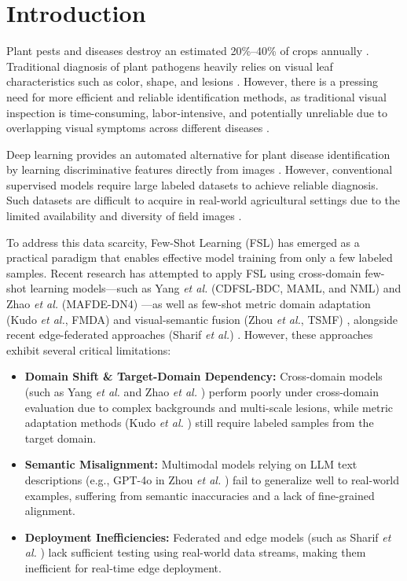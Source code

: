 \documentclass[conference]{IEEEtran}
\begin{document}
\section{Introduction}
Plant pests and diseases destroy an estimated 20\%--40\% of crops annually \cite{richard2022control}. Traditional diagnosis of plant pathogens heavily relies on visual leaf characteristics such as color, shape, and lesions \cite{khakimov2022traditional}. However, there is a pressing need for more efficient and reliable identification methods, as traditional visual inspection is time-consuming, labor-intensive, and potentially unreliable due to overlapping visual symptoms across different diseases \cite{shoaib2023advanced}.

Deep learning provides an automated alternative for plant disease identification by learning discriminative features directly from images \cite{shoaib2023advanced}. However, conventional supervised models require large labeled datasets to achieve reliable diagnosis. Such datasets are difficult to acquire in real-world agricultural settings due to the limited availability and diversity of field images \cite{shoaib2023advanced, shafik2023systematic}.

To address this data scarcity, Few-Shot Learning (FSL) has emerged as a practical paradigm that enables effective model training from only a few labeled samples. Recent research has attempted to apply FSL using cross-domain few-shot learning models---such as Yang \textit{et al.} (CDFSL-BDC, MAML, and NML) \cite{yang2024laboratory} and Zhao \textit{et al.} (MAFDE-DN4) \cite{zhao2024mafde}---as well as few-shot metric domain adaptation (Kudo \textit{et al.}, FMDA) \cite{kudo2025few} and visual-semantic fusion (Zhou \textit{et al.}, TSMF) \cite{zhou2026vsf}, alongside recent edge-federated approaches (Sharif \textit{et al.}) \cite{sharif2026real}. However, these approaches exhibit several critical limitations:
\begin{itemize}
    \item \textbf{Domain Shift \& Target-Domain Dependency:} Cross-domain models (such as Yang \textit{et al.} \cite{yang2024laboratory} and Zhao \textit{et al.} \cite{zhao2024mafde}) perform poorly under cross-domain evaluation due to complex backgrounds and multi-scale lesions, while metric adaptation methods (Kudo \textit{et al.} \cite{kudo2025few}) still require labeled samples from the target domain.
    \item \textbf{Semantic Misalignment:} Multimodal models relying on LLM text descriptions (e.g., GPT-4o in Zhou \textit{et al.} \cite{zhou2026vsf}) fail to generalize well to real-world examples, suffering from semantic inaccuracies and a lack of fine-grained alignment.
    \item \textbf{Deployment Inefficiencies:} Federated and edge models (such as Sharif \textit{et al.} \cite{sharif2026real}) lack sufficient testing using real-world data streams, making them inefficient for real-time edge deployment.
\end{itemize}
\end{document}
